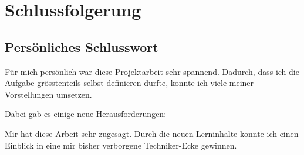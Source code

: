 \chapter{Schlussfolgerung}


\section{Persönliches Schlusswort}
Für mich persönlich war diese Projektarbeit sehr spannend.
Dadurch, dass ich die Aufgabe grösstenteils selbst definieren durfte, konnte ich viele meiner Vorstellungen umsetzen.

Dabei gab es einige neue Herausforderungen:


Mir hat diese Arbeit sehr zugesagt.
Durch die neuen Lerninhalte konnte ich einen Einblick in eine mir bisher verborgene Techniker-Ecke gewinnen.
